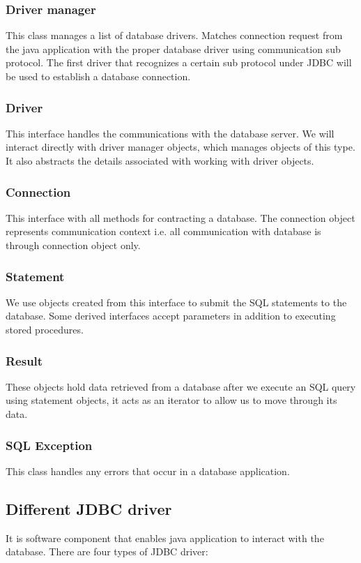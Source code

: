 \documentclass[twocolumn, a4paper]{article}
\begin{document}
\subsubsection{Driver manager}
This class manages a list of database drivers. Matches connection request from
the java application with the proper database driver using communication sub
protocol. The first driver that recognizes a certain sub protocol under JDBC
will be used to establish a database connection.

\subsubsection{Driver}
This interface handles the communications with the database server. We will
interact directly with driver manager objects, which manages objects of this
type. It also abstracts the details associated with working with driver
objects.

\subsubsection{Connection}
This interface with all methods for contracting a database. The connection
object represents communication context i.e. all communication with database is
through connection object only.

\subsubsection{Statement}
We use objects created from this interface to submit the SQL statements to the database. Some derived interfaces accept parameters in addition to executing
stored procedures.

\subsubsection{Result}
These objects hold data retrieved from a database after we execute an SQL query
using statement objects, it acts as an iterator to allow us to move through its
data.

\subsubsection{SQL Exception}
This class handles any errors that occur in a database application.

\subsection{Different JDBC driver}
It is software component that enables java application to interact with the
database. There are four types of JDBC driver:
\end{document}
